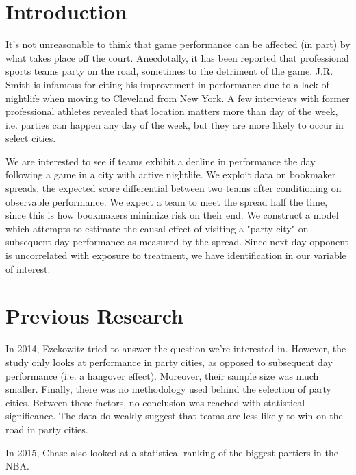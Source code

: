 \documentclass[letterpaper,12pt]{article}
\begin{document}

\section{Introduction}
It's not unreasonable to think that game performance can be affected 
(in part) by what takes place off the court. 
Anecdotally, it has been reported that professional sports teams party on 
the road, sometimes to the detriment of the game.\cite{hoch}
J.R. Smith is infamous for citing his improvement in performance due to a
lack of nightlife when moving to Cleveland from New York.\cite{price,ley}
A few interviews with former professional athletes revealed that location
matters more than day of the week, i.e. parties can happen any day of the week,
but they are more likely to occur in select cities.

We are interested to see if 
teams exhibit a decline in performance the day following a game in a city 
with active nightlife. We exploit data on bookmaker spreads, the expected score 
differential between two teams after conditioning on observable performance. 
We expect a team to meet the spread half the time, since this is how bookmakers 
minimize risk on their end. We construct a model which attempts to 
estimate the causal effect of  visiting a "party-city" on subsequent day 
performance as measured by the spread. Since next-day
opponent is uncorrelated with exposure to treatment, we have identification in our variable of 
interest.


\section{Previous Research}
In 2014, Ezekowitz tried to answer the question we're interested in.\cite{ezekowitz} 
However, the study only
looks at performance in party cities, as opposed to subsequent day performance (i.e.
a hangover effect). Moreover, their sample size was much smaller. Finally, there was no
methodology used behind the selection of party cities. Between these factors, no
conclusion was reached with statistical significance. The data do weakly suggest
that teams are less likely to win on the road in party cities.

In 2015, Chase also looked at a statistical ranking of the biggest partiers in
the NBA.\cite{chase}
\end{document}
